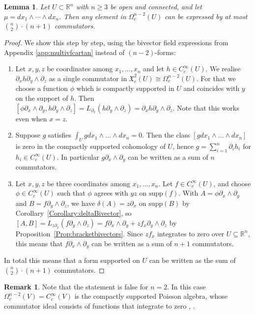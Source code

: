 \documentclass{article}
\newcommand{\R}{\mathbb{R}}
\newcommand{\supp}{\mathrm{supp}}
\newtheorem{Lemma}[Theorem]{Lemma}
\theoremstyle{definition}
\newtheorem{Remark}[Theorem]{Remark}
\begin{document}
\begin{Lemma}\label{Lemma:localperfect}
Let $U\subset \mathbb R^n$ with $n\geq 3$ be open and connected, and let $\mu = dx_1\wedge \cdots \wedge dx_n$.
Then any element in  $\Omega_{c}^{n-2}(U)$ can be expressed by at most $\binom{n}{2}\cdot (n+1)$ commutators.
\end{Lemma}

\begin{proof}
We show this step by step, using the bivector field expressions from Appendix \ref{app:multivfcartan} instead of $(n{-}2)$-forms:
\begin{enumerate}
    \item Let $x,y,z$ be coordinates among $x_1,...,x_n$ and let $h\in C^{\infty}_c(U)$. We realise $\partial_xh\partial_y\wedge\partial_z$ as 
    a single commutator  in  $\mathfrak X^2_{c}(U)\cong\Omega_{c}^{n-2}(U)$. For that we choose a function $\phi$ which is compactly supported in $U$ and coincides with $y$ on the support of $h$. Then 
    $[\phi \partial_x\wedge \partial_y, h\partial_y\wedge\partial_z]=L_{\partial_x}(h\partial_y\wedge\partial_z)=\partial_xh\partial_y\wedge\partial_z$. Note that this works even when $x=z$.
    \item Suppose $g$ satisfies $\int_U gdx_1\wedge ...\wedge dx_n=0$. Then the class ${[gdx_1\wedge ...\wedge dx_n]}$ is zero in the compactly supported cohomology of $U$, hence $g=\sum_{i=1}^n\partial_ih_i$ for $h_i\in C^{\infty}_c(U)$. In particular $g\partial_x\wedge\partial_y$ can be written as a sum of $n$ commutators.
    \item Let $x, y, z$ be three coordinates among $x_1, \ldots, x_n$. Let $f \in C^{\infty}_{c}(U)$, 
and choose $\phi \in C^{\infty}_{c}(U)$ such that $\phi$ agrees with $yz$ on $\mathrm{supp}(f)$.
With $A = \phi \partial_{x} \wedge \partial_y$ and $B = f\partial_{y}\wedge \partial_z$, we have $\delta(A)=z\partial_x$
on $\supp(B)$ by
Corollary~\ref{Corollary:deltaBivector}, so $[A,B] = L_{z\partial_x}(f\partial_y\wedge \partial_z) = f\partial_x \wedge \partial_y + z f_x \partial_y \wedge \partial_z$ by Proposition~\ref{Prop:bracketbivectors}.
Since $zf_x$ integrates to zero over $U \subseteq \R^n$, this means that $ f\partial_x \wedge \partial_y$ can be written as a sum of $n+1$ commutators.
\end{enumerate}
In total this means that a form supported on $U$ can be written as the sum of $\binom{n}{2}\cdot (n+1)$ commutators.
\end{proof}


\begin{Remark}
Note that the statement is false for $n=2$. In this case $\Omega^{n-2}_{c}(V) = C^{\infty}_{c}(V)$ is the compactly supported Poisson algebra, whose commutator ideal consists of functions that integrate to zero \cite[Section 12]{ALDM74}, \cite[Prop.~3.1]{JV16}.  
\end{Remark}
\end{document}
